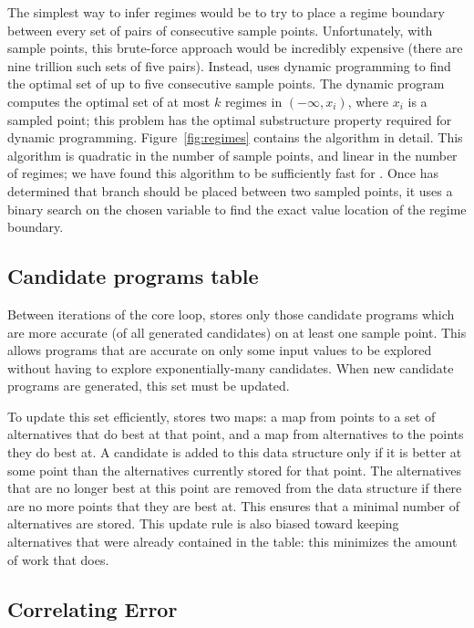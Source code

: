 \documentclass[paper.tex]{subfiles}
\begin{document}
The simplest way to infer regimes would be to try
  to place a regime boundary between every set
  of \nRegimes pairs of consecutive sample points.
Unfortunately, with \nSample sample points,
  this brute-force approach would be incredibly expensive
  (there are nine trillion such sets of five pairs).
Instead, \casio uses dynamic programming
  to find the optimal set of up to five consecutive sample points.
The dynamic program computes the optimal set
  of at most $k$ regimes in $(-\infty, x_i)$, where $x_i$ is a sampled point;
  this problem has the optimal substructure property
  required for dynamic programming.
Figure~\ref{fig:regimes} contains the algorithm in detail.
This algorithm is quadratic in the number of sample points,
  and linear in the number of regimes;
  we have found this algorithm to be sufficiently fast for \casio.
Once \casio has determined that branch should be placed
  between two sampled points,
  it uses a binary search on the chosen variable to 
  find the exact value location of the regime boundary.


\subsection{Candidate programs table}

Between iterations of the core loop,
  \casio stores only those candidate programs
  which are more accurate (of all generated candidates)
  on at least one sample point.
This allows programs that are accurate
  on only some input values to be explored
  without having to explore exponentially-many candidates.
When new candidate programs are generated,
  this set must be updated.

To update this set efficiently, \casio stores two maps:
  a map from points to a set of alternatives that do best at that point,
  and a map from alternatives to the points they do best at.
A candidate is added to this data structure
  only if it is better at some point
  than the alternatives currently stored for that point.
The alternatives that are no longer best at this point
  are removed from the data structure
  if there are no more points that they are best at.
This ensures that a minimal number of alternatives are stored.
This update rule is also biased toward keeping alternatives
  that were already contained in the table:
  this minimizes the amount of work that \casio does.

\subsection{Correlating Error}
\end{document}

